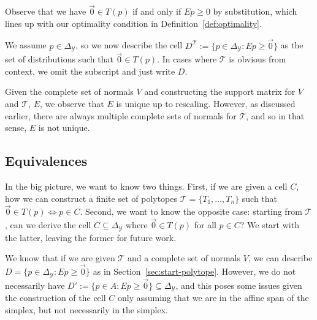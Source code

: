 \documentclass[12pt]{article}
\newcommand{\simplex}{\Delta_\Y}
\newcommand{\T}{\mathcal{T}}
\newcommand{\Y}{\mathcal{Y}}
\begin{document}
  Observe that we have $\vec 0 \in T(p)$ if and only if $E p \geq 0$ by substitution, which lines up with our optimality condition in Definition~\ref{def:optimality}.  
  
  We assume $p \in \simplex$, so we now describe the cell $D^\T := \{p \in \simplex : Ep \geq \vec 0\}$ as the set of distributions such that $\vec 0 \in T(p)$.
  In cases where $\T$ is obvious from context, we omit the subscript and just write $D$.
  
  Given the complete set of normals $V$ and constructing the support matrix for $V$ and $\T$, $E$, we observe that $E$ is unique up to rescaling.
  However, as discussed earlier, there are always multiple complete sets of normals for $\T$, and so in that sense, $E$ is not unique.
  
  \subsection{Equivalences}
  In the big picture, we want to know two things.
  First, if we are given a cell $C$, how we can construct a finite set of polytopes $\T = \{T_1, \ldots, T_n\}$ such that $\vec 0 \in T(p) \iff p \in C$.
  Second, we want to know the opposite case: starting from $\T$, can we derive the cell $C \subseteq \simplex$ where $\vec 0 \in T(p)$ for all $p \in C$?
  We start with the latter, leaving the former for future work.
  
  We know that if we are given $\T$ and a complete set of normals $V$, we can describe $D = \{p \in \simplex : Ep \geq \vec 0\}$ as in Section~\ref{sec:start-polytope}.
  However, we do not necessarily have $D' := \{p \in A : Ep \geq \vec 0\} \subseteq \simplex$, and this poses some issues given the construction of the cell $C$ only assuming that we are in the affine span of the simplex, but not necessarily in the simplex.
  
\end{document}
